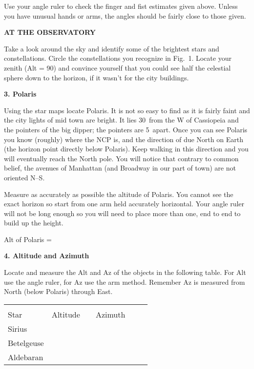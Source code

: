 \documentclass[12pt]{article}
\begin{document}
Use your angle ruler to check the finger and fist estimates given
above. Unless you have unusual hands or arms, the angles should be
fairly close to those given.

\medskip
\bigskip\noindent
{\bf AT THE OBSERVATORY}
\bigskip


\noindent 
Take a look around the sky and identify some of the brightest stars
and constellations. Circle the constellations you recognize in
Fig.~1. 
Locate your zenith (Alt = 90\deg) and convince yourself that you
could see half the celestial sphere down to the horizon, if it wasn't
for the city buildings.

\bigskip\noindent
{\bf 3. Polaris}

\bigskip\noindent
Using the star maps locate Polaris. It is not so easy to find as it is
fairly faint and the city lights of mid town are bright. It lies
30\deg\ from the W of Cassiopeia and the pointers of the big dipper;
the pointers are 5\deg\ apart.  Once you can see Polaris you know
(roughly) where the NCP is, and the direction of due North on Earth
(the horizon point directly below Polaris). Keep walking in this
direction and you will eventually reach the North pole. You will
notice that contrary to common belief, the avenues of Manhattan (and
Broadway in our part of town) are not oriented N--S.
 
Measure as accurately as possible the altitude of Polaris. You cannot
see the exact horizon so start from one arm held accurately
horizontal. Your angle ruler will not be long enough so you will need to
place more than one, end to end to build up the height.

\bigskip
{\hfill Alt of Polaris = \makebox[4cm]{\hrulefill} \hfill}

\bigskip\noindent
{\bf 4. Altitude and Azimuth}

\bigskip\noindent
Locate and measure the Alt and Az of the objects in the following
table. For Alt use the angle ruler, for Az use the arm
method. Remember Az is measured from North (below Polaris) through East.

\begin{center}
\begin{tabular}{lcc} \hline \\ [-6pt]
Star   &\hspace{1.5cm} Altitude \hspace{1.5cm} & \ \ Azimuth \ \ \ \
 \\ [6pt]  \hline
Sirius    &   &        \\ \hline
Betelgeuse    &   &       \\ \hline
Aldebaran    &   &       \\  \hline
\end{tabular}
\end{center}
\end{document}
